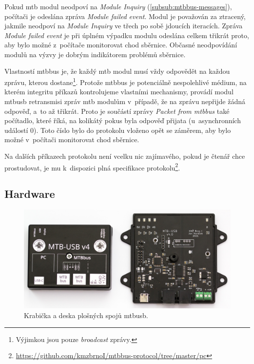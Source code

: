 Pokud \gls{mtb} modul neodpoví na \textit{Module Inquiry}
(\ref{subsub:mtbbus-messages}), počítači je odeslána zpráva \textit{Module
failed event}. Modul je považován za ztracený, jakmile neodpoví na
\textit{Module Inquiry} ve třech po sobě jdoucích iteracích. Zpráva
\textit{Module failed event} je při úplném výpadku modulu odeslána
celkem třikrát proto, aby bylo možné z~počítače monitorovat chod sběrnice.
Občasné neodpovídání modulů na výzvy je dobrým indikátorem problémů sběrnice.

Vlastností \gls{mtbbus} je, že každý \gls{mtb} modul musí vždy
odpovědět na každou zprávu, kterou dostane\footnote{Výjimkou jsou pouze
\textit{broadcast} zprávy.}. Protože \gls{mtbbus} je potenciálně nespolehlivé
médium, na kterém integritu příkazů kontrolujeme vlastními mechanismy, provádí
modul \gls{mtbusb} retransmisi zpráv \gls{mtb} modulům v~případě, že na zprávu
nepřijde žádná odpověď, a~to až třikrát. Proto je součástí zprávy \textit{Packet
from \gls{mtbbus}} také počítadlo, které říká, na kolikátý pokus byla
odpověď přijata (u~asynchronních událostí $0$). Toto číslo bylo do protokolu
vloženo opět se záměrem, aby bylo možné v~počítači monitorovat chod sběrnice.

Na dalších příkazech protokolu není vcelku nic zajímavého, pokud je čtenář chce
prostudovat, je mu k~dispozici plná specifikace protokolu\footnote{
\url{https://github.com/kmzbrnoI/mtbbus-protocol/tree/master/pc}}.

\subsection{Hardware} \label{subsec:mtbusb:hardware}

\begin{figure}[ht]
\includegraphics[width=\textwidth]{data/usb-inside.jpg}
\caption{Krabička a deska plošných spojů \gls{mtbusb}.}
\label{fig:mtbusb-inside}
\end{figure}

